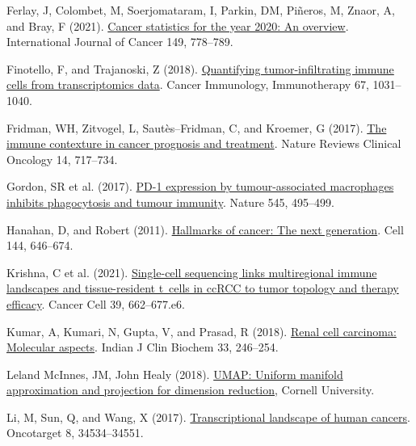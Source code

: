 \documentclass[
  parskip,
  oneside]{scrreprt}
\newlength{\cslhangindent}
\newlength{\cslentryspacingunit} %
\newenvironment{CSLReferences}[2] %
 {%
  \setlength{\parindent}{0pt}
  \ifodd #1
  \let\oldpar\par
  \def\par{\hangindent=\cslhangindent\oldpar}
  \fi
  \setlength{\parskip}{#2\cslentryspacingunit}
 }%
 {}
\begin{document}
\begin{CSLReferences}{0}{0}
\leavevmode{}%
Ferlay, J, Colombet, M, Soerjomataram, I, Parkin, DM, Piñeros, M, Znaor,
A, and Bray, F (2021). \href{https://doi.org/10.1002/ijc.33588}{Cancer
statistics for the year 2020: An overview}. International Journal of
Cancer 149, 778--789.

\leavevmode{}%
Finotello, F, and Trajanoski, Z (2018).
\href{https://doi.org/10.1007/s00262-018-2150-z}{Quantifying
tumor-infiltrating immune cells from transcriptomics data}. Cancer
Immunology, Immunotherapy 67, 1031--1040.

\leavevmode{}%
Fridman, WH, Zitvogel, L, Sautès--Fridman, C, and Kroemer, G (2017).
\href{https://doi.org/10.1038/nrclinonc.2017.101}{The immune contexture
in cancer prognosis and treatment}. Nature Reviews Clinical Oncology 14,
717--734.

\leavevmode{}%
Gordon, SR et al. (2017).
\href{https://doi.org/10.1038/nature22396}{PD-1 expression by
tumour-associated macrophages inhibits phagocytosis and tumour
immunity}. Nature 545, 495--499.

\leavevmode{}%
Hanahan, D, and Robert (2011).
\href{https://doi.org/10.1016/j.cell.2011.02.013}{Hallmarks of cancer:
The next generation}. Cell 144, 646--674.

\leavevmode{}%
Krishna, C et al. (2021).
\href{https://doi.org/10.1016/j.ccell.2021.03.007}{Single-cell
sequencing links multiregional immune landscapes and tissue-resident
t~cells in ccRCC to tumor topology and therapy efficacy}. Cancer Cell
39, 662--677.e6.

\leavevmode{}%
Kumar, A, Kumari, N, Gupta, V, and Prasad, R (2018).
\href{https://doi.org/10.1007/s12291-017-0713-y}{Renal cell carcinoma:
Molecular aspects}. Indian J Clin Biochem 33, 246--254.

\leavevmode{}%
Leland McInnes, JM, John Healy (2018).
\href{\%0Ahttps://doi.org/10.48550/arXiv.1802.03426}{UMAP: Uniform
manifold approximation and projection for dimension reduction}, Cornell
University.

\leavevmode{}%
Li, M, Sun, Q, and Wang, X (2017).
\href{https://doi.org/10.18632/oncotarget.15837}{Transcriptional
landscape of human cancers}. Oncotarget 8, 34534--34551.


\end{CSLReferences}
\end{document}
